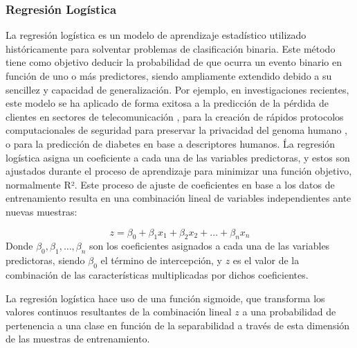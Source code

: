 \documentclass{uathesis-es}
\begin{document}







\subsubsection*{Regresión Logística}



La regresión logística es un modelo de aprendizaje estadístico utilizado históricamente para solventar problemas de clasificación binaria. Este método tiene como objetivo deducir la probabilidad de que ocurra un evento binario en función de uno o más predictores, siendo ampliamente extendido debido a su sencillez y capacidad de generalización. Por ejemplo, en investigaciones recientes, este modelo se ha aplicado de forma exitosa a la predicción de la pérdida de clientes en sectores de telecomunicación \cite{jain2020churn}, para la creación de rápidos protocolos computacionales de seguridad para preservar la privacidad del genoma humano \cite{de2021high}, o para la predicción de diabetes \cite{joshi2021predicting} en base a descriptores humanos. Ĺa regresión logística asigna un coeficiente a cada una de las variables predictoras, y estos son ajustados durante el proceso de aprendizaje para minimizar una función objetivo, normalmente R². Este proceso de ajuste de coeficientes en base a los datos de entrenamiento resulta en una combinación lineal de variables independientes ante nuevas muestras:

\[
z = \beta_0 + \beta_1 x_1 + \beta_2 x_2 + \dots + \beta_n x_n
\]
Donde $\beta_0, \beta_1, \dots, \beta_n$ son los coeficientes asignados a cada una de las variables predictoras, siendo $\beta_0$ el término de intercepción, y $z$ es el valor de la combinación de las características multiplicadas por dichos coeficientes.

La regresión logística hace uso de una función sigmoide, que transforma los valores continuos resultantes de la combinación lineal $z$ a una probabilidad de pertenencia a una clase en función de la separabilidad a través de esta dimensión de las muestras de entrenamiento.
\end{document}
